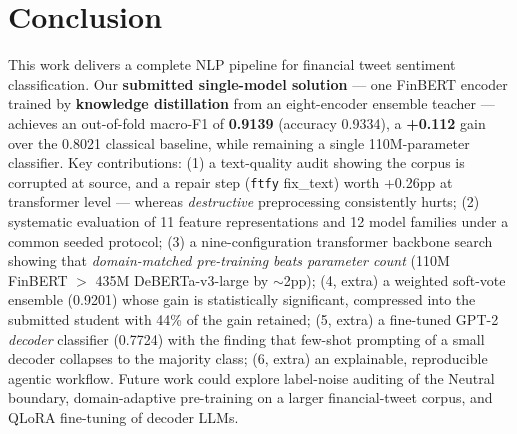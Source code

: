\documentclass[11pt,a4paper]{article}
\newcommand{\distf}{0.9139}    %
\newcommand{\distacc}{0.9334}  %
\begin{document}
\section{Conclusion}
This work delivers a complete NLP pipeline for financial tweet sentiment classification. Our
\textbf{submitted single-model solution} --- one FinBERT encoder trained by \textbf{knowledge
distillation} from an eight-encoder ensemble teacher --- achieves an out-of-fold macro-F1 of
\textbf{\distf} (accuracy \distacc), a \textbf{+0.112} gain over the 0.8021 classical baseline,
while remaining a single 110M-parameter classifier. Key contributions: (1) a text-quality audit
showing the corpus is corrupted at source, and a repair step (\texttt{ftfy} fix\_text) worth
+0.26pp at transformer level --- whereas \emph{destructive} preprocessing consistently hurts;
(2) systematic evaluation of 11 feature representations and 12 model families under a common
seeded protocol; (3) a nine-configuration transformer backbone search showing that
\emph{domain-matched pre-training beats parameter count} (110M FinBERT $>$ 435M DeBERTa-v3-large
by $\sim$2pp); (4, extra) a weighted soft-vote ensemble (0.9201) whose gain is statistically
significant, compressed into the submitted student with 44\% of the gain retained; (5, extra) a
fine-tuned GPT-2 \emph{decoder} classifier (0.7724) with the finding that few-shot prompting of a
small decoder collapses to the majority class; (6, extra) an explainable, reproducible agentic
workflow. Future work could explore label-noise auditing of the Neutral boundary, domain-adaptive
pre-training on a larger financial-tweet corpus, and QLoRA fine-tuning of decoder LLMs.

\end{document}
